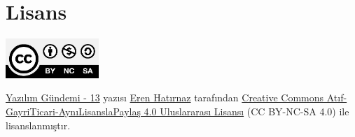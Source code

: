 \documentclass[11pt]{article}
\begin{document}
\section{Lisans}
\label{sec:orgaceec2e}
\begin{center}
\begin{center}
\includegraphics[height=1.5cm]{../../../img/CC_BY-NC-SA_4.0.png}
\end{center}

\href{yazilim-gundemi-13.pdf}{Yazılım Gündemi - 13} yazısı \href{https://erenhatirnaz.github.io}{Eren Hatırnaz} tarafından \href{http://creativecommons.org/licenses/by-nc-sa/4.0/}{Creative Commons
Atıf-GayriTicari-AynıLisanslaPaylaş 4.0 Uluslararası Lisansı} (CC BY-NC-SA 4.0)
ile lisanslanmıştır.
\end{center}
\end{document}
